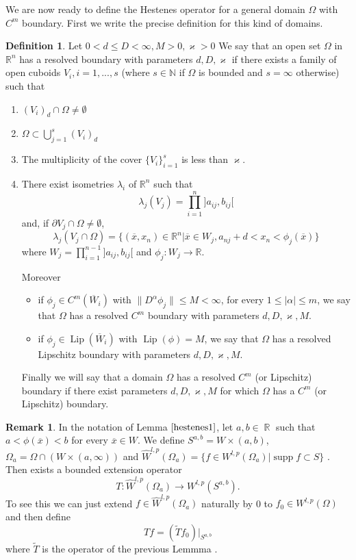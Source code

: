 \documentclass[12pt]{article}
\theoremstyle{definition}
\newtheorem{definition}{Definition}
\newtheorem{remark}{Remark}
\DeclareMathOperator\supp{supp}
\DeclareMathOperator\Lip{Lip}
\DeclareMathOperator\rr{\mathbb{R}}
\begin{document}
We are now ready to define the Hestenes operator for a general domain $\Omega$ with $C^m$ boundary. First we write the precise definition for this kind of domains.

\begin{definition}
Let $0<d\le D <\infty, M>0, \varkappa>0$ We say that an open set $\Omega$ in $\mathbb{R}^n$ has a resolved boundary with parameters $d,D, \varkappa$ if there exists a family of open cuboids $V_i , i=1,...,s$ (where $s \in \mathbb{N}$ if $\Omega$ is bounded and $s=\infty$ otherwise) such that
\begin{enumerate}
\item $(V_i)_d \cap \Omega \neq \emptyset$
\item $\Omega \subset \bigcup\limits_{j=1}^s (V_i)_d$
\item The multiplicity of the cover $\{ V_i\}_{i=1}^s$ is less than $ \varkappa$.
\item There exist isometries $\lambda_i$ of $\mathbb{R}^n$ such that
\[   \lambda_j(V_j)= \prod_{i=1}^n ]a_{ij},b_{ij}[\]
and, if $\partial V_j \cap \Omega \neq \emptyset$,
\[ \lambda_j(V_j\cap \Omega)= \{ (\overline x, x_n) \in \mathbb{R}^n  |  \overline x \in W_j , a_{nj}+d<x_n<\phi_j(\overline x)\} \]
where $W_j=\prod\limits_{i=1}^{n-1} ]a_{ij},b_{ij}[$ and $\phi_j : W_j \rightarrow \mathbb{R}$.

Moreover
\begin{itemize}
\item if $\phi_j \in C^m(\overline W_i)$ with  $\| D^{\alpha}\phi_j \|\le M <\infty $, for every $1\le|\alpha|\le m$, we say that $\Omega$  has a resolved $C^m$ boundary with parameters $d,D, \varkappa,M$.
\item if $\phi_j \in \Lip(\overline W_i)$ with  $\Lip(\phi)= M$,  we say that $\Omega$  has a resolved Lipschitz boundary with parameters $d,D, \varkappa,M$.
\end{itemize}
Finally we will say that a domain $\Omega$ has a resolved $C^m$ (or Lipschitz) boundary if there exist parameters $d,D,\varkappa,M$ for which $\Omega$ has a $C^m$ (or Lipschitz) boundary.
\end{enumerate}

\end{definition}

\begin{remark}\label{hestenesr}
In the notation of Lemma $\ref{hestenes1}$, let $a,b \in \rr$ such that $a<\phi(\overline x) <b$ for every $\overline x \in W$. We define $S^{a,b}=W\times (a,b)$, $\Omega_a=\Omega \cap (W \times (a,\infty))$ and $\widehat W^{l,p}(\Omega_a)=\{f \in W^{l,p}(\Omega_a) | \supp f \subset S\}$ . Then exists a bounded extension operator
\[ T: \widehat W^{l,p}(\Omega_a)\rightarrow W^{l,p}(S^{a,b}).\]
To see this we can just extend $f\in \widehat W^{l,p}(\Omega_a)$ naturally by 0 to  $f_0\in W^{l,p}(\Omega)$ and then define
\[ Tf=(\widetilde T f_0)\big|_{S^{a,b}}\]
where $\widetilde T$ is the operator of the previous Lemmma .
\end{remark}
\end{document}
